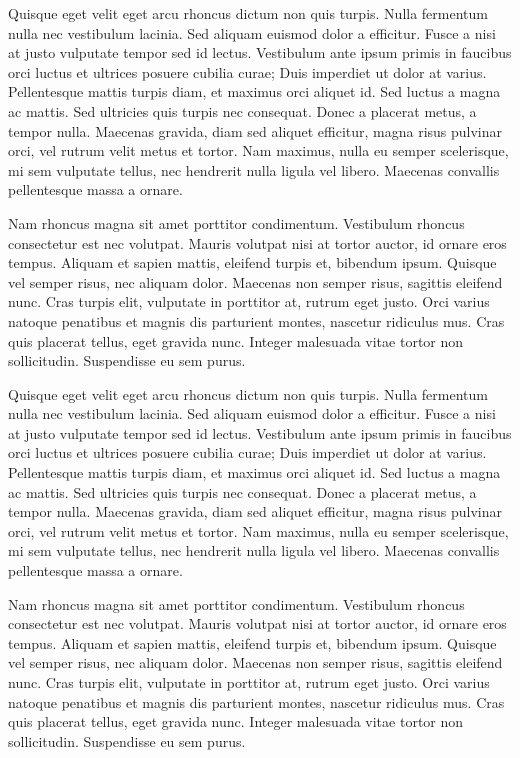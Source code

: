 \documentclass[a4paper]{article}
\begin{document}
    \begin{answer}
        Quisque eget velit eget arcu rhoncus dictum non quis turpis. Nulla fermentum nulla nec vestibulum lacinia. Sed aliquam euismod dolor a efficitur. Fusce a nisi at justo vulputate tempor sed id lectus. Vestibulum ante ipsum primis in faucibus orci luctus et ultrices posuere cubilia curae; Duis imperdiet ut dolor at varius. Pellentesque mattis turpis diam, et maximus orci aliquet id. Sed luctus a magna ac mattis. Sed ultricies quis turpis nec consequat. Donec a placerat metus, a tempor nulla. Maecenas gravida, diam sed aliquet efficitur, magna risus pulvinar orci, vel rutrum velit metus et tortor. Nam maximus, nulla eu semper scelerisque, mi sem vulputate tellus, nec hendrerit nulla ligula vel libero. Maecenas convallis pellentesque massa a ornare.

        Nam rhoncus magna sit amet porttitor condimentum. Vestibulum rhoncus consectetur est nec volutpat. Mauris volutpat nisi at tortor auctor, id ornare eros tempus. Aliquam et sapien mattis, eleifend turpis et, bibendum ipsum. Quisque vel semper risus, nec aliquam dolor. Maecenas non semper risus, sagittis eleifend nunc. Cras turpis elit, vulputate in porttitor at, rutrum eget justo. Orci varius natoque penatibus et magnis dis parturient montes, nascetur ridiculus mus. Cras quis placerat tellus, eget gravida nunc. Integer malesuada vitae tortor non sollicitudin. Suspendisse eu sem purus.
    \end{answer}

    \begin{answer}
        Quisque eget velit eget arcu rhoncus dictum non quis turpis. Nulla fermentum nulla nec vestibulum lacinia. Sed aliquam euismod dolor a efficitur. Fusce a nisi at justo vulputate tempor sed id lectus. Vestibulum ante ipsum primis in faucibus orci luctus et ultrices posuere cubilia curae; Duis imperdiet ut dolor at varius. Pellentesque mattis turpis diam, et maximus orci aliquet id. Sed luctus a magna ac mattis. Sed ultricies quis turpis nec consequat. Donec a placerat metus, a tempor nulla. Maecenas gravida, diam sed aliquet efficitur, magna risus pulvinar orci, vel rutrum velit metus et tortor. Nam maximus, nulla eu semper scelerisque, mi sem vulputate tellus, nec hendrerit nulla ligula vel libero. Maecenas convallis pellentesque massa a ornare.

        Nam rhoncus magna sit amet porttitor condimentum. Vestibulum rhoncus consectetur est nec volutpat. Mauris volutpat nisi at tortor auctor, id ornare eros tempus. Aliquam et sapien mattis, eleifend turpis et, bibendum ipsum. Quisque vel semper risus, nec aliquam dolor. Maecenas non semper risus, sagittis eleifend nunc. Cras turpis elit, vulputate in porttitor at, rutrum eget justo. Orci varius natoque penatibus et magnis dis parturient montes, nascetur ridiculus mus. Cras quis placerat tellus, eget gravida nunc. Integer malesuada vitae tortor non sollicitudin. Suspendisse eu sem purus.
    \end{answer}
\end{document}
